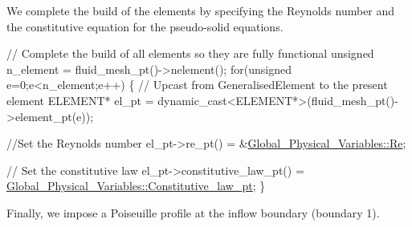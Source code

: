 We complete the build of the elements by specifying the Reynolds number and the constitutive equation for the pseudo-\/solid equations.


\begin{DoxyCodeInclude}
 
 \textcolor{comment}{// Complete the build of all elements so they are fully functional}
 \textcolor{keywordtype}{unsigned} n\_element = fluid\_mesh\_pt()->nelement();
 \textcolor{keywordflow}{for}(\textcolor{keywordtype}{unsigned} e=0;e<n\_element;e++)
  \{
   \textcolor{comment}{// Upcast from GeneralisedElement to the present element}
   ELEMENT* el\_pt = \textcolor{keyword}{dynamic\_cast<}ELEMENT*\textcolor{keyword}{>}(fluid\_mesh\_pt()->element\_pt(e));

   \textcolor{comment}{//Set the Reynolds number}
   el\_pt->re\_pt() = &\hyperlink{namespaceGlobal__Physical__Variables_ab814e627d2eb5bc50318879d19ab16b9}{Global\_Physical\_Variables::Re};

   \textcolor{comment}{// Set the constitutive law}
   el\_pt->constitutive\_law\_pt() =
    \hyperlink{namespaceGlobal__Physical__Variables_a2a37fb040c832ee7a086bb13bb02a100}{Global\_Physical\_Variables::Constitutive\_law\_pt};
  \} 

\end{DoxyCodeInclude}


Finally, we impose a Poiseuille profile at the inflow boundary (boundary 1).


